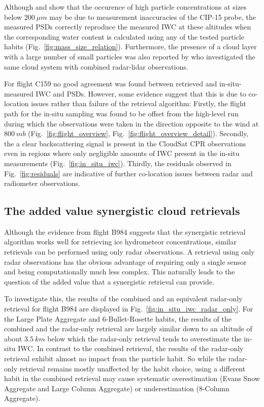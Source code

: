 \documentclass[journal abbreviation, manuscript]{copernicus}
\begin{document}
Although \citet{oshea21} and \citet{oshea19} show that the occurence of high
particle concentrations at sizes below $200\ \unit{\mu m}$ may be due to
measurement inaccuracies of the CIP-15 probe, the measured PSDs correctly
reproduce the measured IWC at these altitudes when the corresponding water
content is calculated using any of the tested particle habits
(Fig.~\ref{fig:mass_size_relation}). Furthermore, the presence of a cloud layer
with a large number of small particles was also reported by \citet{ewald21} who
investigated the same cloud system with combined radar-lidar observations.

For flight C159 no good agreement was found between retrieved and
in-situ-measured IWC and PSDs. However, some evidence suggest that this is due
to co-location issues rather than failure of the retrieval algorithm: Firstly,
the flight path for the in-situ sampling was found to be offset from the
high-level run during which the observations were taken in the direction
opposite to the wind at $800\ \unit{mb}$ (Fig.~\ref{fig:flight_overview},
Fig.~\ref{fig:flight_overview_detail}). Secondly, the a clear backscattering
signal is present in the CloudSat CPR observations even in regions where only
negligible amounts of IWC present in the in-situ measurements
(Fig.~\ref{fig:in_situ_iwc}). Thirdly, the residuals observed in
Fig.~\ref{fig:residuals} are indicative of further co-location issues between
radar and radiometer observations.

\subsection{The added value synergistic cloud retrievals}

Although the evidence from flight B984 suggests that the synergistic
retrieval algorithm works well for retrieving ice hydrometeor concentrations,
similar retrievals can be performed using only radar observations. A retrieval
using only radar observations has the obvious advantage of requiring only
a single sensor and being computationally much less complex. This naturally
leads to the question of the added value that a synergistic retrieval
can provide.

To investigate this, the results of the combined and an equivalent radar-only
retrieval for flight B984 are displayed in
Fig.~\ref{fig:in_situ_iwc_radar_only}. For the Large Plate Aggregate and
6-Bullet-Rosette habits, the results of the combined and the radar-only
retrieval are largely similar down to an altitude of about $3.5\ \unit{km}$
below which the radar-only retrieval tends to overestimate the in-situ IWC. In
contrast to the combined retrieval, the results of the radar-only retrieval
exhibit almost no impact from the particle habit. So while the radar-only
retrieval remains mostly unaffected by the habit choice, using a different habit
in the combined retrieval may cause systematic overestimation (Evans Snow
Aggregate and Large Column Aggregate) or underestimation (8-Column Aggregate).
\end{document}

